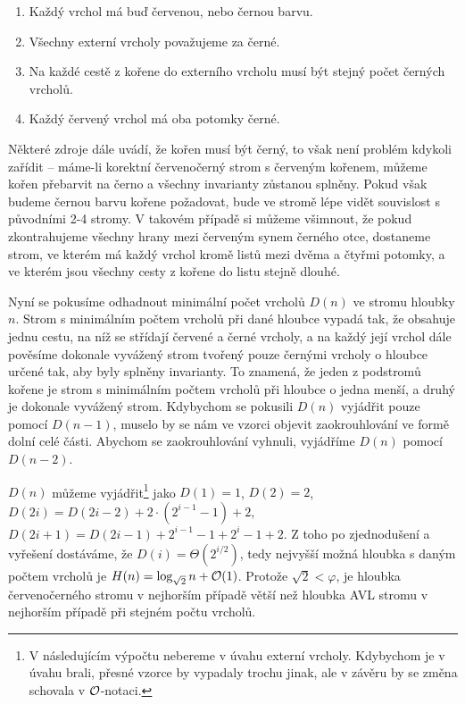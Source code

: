 \begin{enumerate}
\item Každý vrchol má buď červenou, nebo černou barvu.
\item Všechny externí vrcholy považujeme za černé.
\item Na každé cestě z kořene do externího vrcholu musí být stejný počet černých vrcholů.
\item Každý červený vrchol má oba potomky černé.
\end{enumerate}

Některé zdroje dále uvádí, že kořen musí být černý, to však není problém kdykoli zařídit -- máme-li korektní červenočerný strom s červeným kořenem, můžeme kořen přebarvit na černo a všechny invarianty zůstanou splněny. Pokud však budeme černou barvu kořene požadovat, bude ve stromě lépe vidět souvislost s původními 2-4 stromy. V takovém případě si můžeme všimnout, že pokud zkontrahujeme všechny hrany mezi červeným synem černého otce, dostaneme strom, ve kterém má každý vrchol kromě listů mezi dvěma a čtyřmi potomky, a ve kterém jsou všechny cesty z kořene do listu stejně dlouhé.

Nyní se pokusíme odhadnout minimální počet vrcholů $D(n)$ ve stromu hloubky $n$. Strom s minimálním počtem vrcholů při dané hloubce vypadá tak, že obsahuje jednu cestu, na níž se střídají červené a černé vrcholy, a na každý její vrchol dále pověsíme dokonale vyvážený strom tvořený pouze černými vrcholy o hloubce určené tak, aby byly splněny invarianty. To znamená, že jeden z podstromů kořene je strom s minimálním počtem vrcholů při hloubce o jedna menší, a druhý je dokonale vyvážený strom. Kdybychom se pokusili $D(n)$ vyjádřit pouze pomocí $D(n-1)$, muselo by se nám ve vzorci objevit zaokrouhlování ve formě dolní celé části. Abychom se zaokrouhlování vyhnuli, vyjádříme $D(n)$ pomocí $D(n-2)$.

$D(n)$ můžeme vyjádřit\footnote{V následujícím výpočtu nebereme v úvahu externí vrcholy. Kdybychom je v úvahu brali, přesné vzorce by vypadaly trochu jinak, ale v závěru by se změna schovala v $\mathcal O$-notaci.} jako $D(1)=1$, $D(2) = 2$, $D(2i) = D(2i-2) + 2 \cdot
(2^{i - 1} - 1) + 2$, $D(2i + 1) = D(2i - 1) + 2^{i-1}-1 + 2^i-1 + 2$. Z toho
po zjednodušení a vyřešení dostáváme, že $D(i)=\Theta(2^{i/2})$, tedy nejvyšší
možná hloubka s daným počtem vrcholů je $H(n) = \log_{\sqrt 2} n + \mathcal O(1)$.
Protože  $\sqrt 2 < \varphi$, je hloubka červenočerného stromu v nejhorším
případě větší než hloubka AVL stromu v nejhorším případě při stejném počtu
vrcholů.

